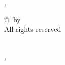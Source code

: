 \begin{flushright}
        \vspace{1 cm}
        \underline{\hspace{8cm}} \\ 
        \MakeUppercase{\authorName} \\
        \schoolPlace, \thesisDate
\end{flushright}

\null
\vfill

\begin{center}
	{@}\thesisYear\ by \authorName \\
	All rights reserved
\end{center}

\begin{center}
    \textbf{\schoolName}\\
    \textbf{\schoolPlace}, \textbf{\thesisDate} 
\end{center}
